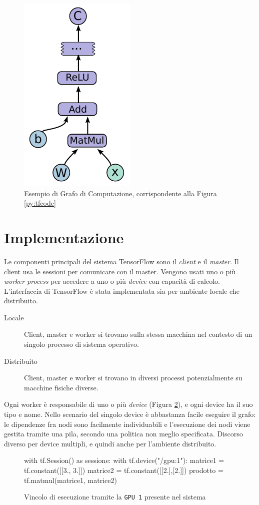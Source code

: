 \documentclass[DIV=calc, paper=a4, fontsize=11pt]{scrartcl}	 %
\begin{document}
\begin{multicols}{2}
\begin{figure}[H]
				\includegraphics[scale=.685]{img/computation.png}
				\caption{Esempio di Grafo di Computazione, corrispondente alla Figura \ref{py:tfcode}}
				\label{fig:computation}
			\end{figure}
				
		
		\section{Implementazione}
			Le componenti principali del sistema TensorFlow sono il \textit{client} e il \textit{master}. Il client usa le sessioni per comunicare con il master. Vengono usati uno o più \textit{worker process} per accedere a uno o più \textit{device} con capacità di calcolo. L'interfaccia di TensorFlow è stata implementata sia per ambiente locale che distribuito.
			\begin{description}
				\item[Locale] Client, master e worker si trovano sulla stessa macchina nel contesto di un singolo processo di sistema operativo.
				\item[Distribuito] Client, master e worker si trovano in diversi processi potenzialmente su macchine fisiche diverse.
			\end{description}
			Ogni worker è responsabile di uno o più \textit{device} (Figura \ref{py:device}), e ogni device ha il suo tipo e nome. Nello scenario del singolo device è abbastanza facile eseguire il grafo: le dipendenze fra nodi sono facilmente individuabili e l'esecuzione dei nodi viene gestita tramite una pila, secondo una politica non meglio specificata. Discorso diverso per device multipli, e quindi anche per l'ambiente distribuito.
			\begin{figure}
				\centering
				\begin{python}
with tf.Session() as sessione:
	with tf.device("/gpu:1"):
		matrice1 = tf.constant([[3., 3.]])
		matrice2 = tf.constant([[2.],[2.]])
		prodotto = tf.matmul(matrice1, matrice2)
				\end{python}
				\caption{Vincolo di esecuzione tramite la \texttt{GPU 1} presente nel sistema}
				\label{py:device}
			\end{figure}

\end{multicols}
\end{document}
